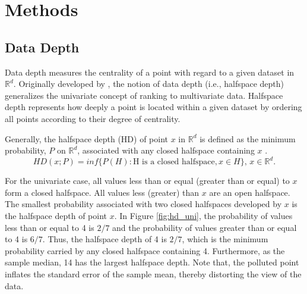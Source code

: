 \documentclass[a4paper,UKenglish]{lipics-v2018}
\begin{document}
%
%


\section{Methods}
\label{sec:methods}

\subsection{Data Depth}
Data depth measures the centrality of a point with regard to a given dataset in $\mathbb{R}^d$.
Originally developed by \cite{tukey75ICM}, the notion of data depth (i.e., halfspace depth) generalizes the univariate concept of ranking to multivariate data.
Halfspace depth represents how deeply a point is located within a given dataset by ordering all points according to their degree of centrality. 

Generally, the halfspace depth (HD) of point $x$ in $\mathbb{R}^d$ is defined as the minimum probability, $P$ on $\mathbb{R}^d$, associated with any closed halfspace containing $x$ \cite{liu00AS}. 
\begin{equation*}\label{eq:hd}
HD(x;P) = inf\{P(H): \text{H is a closed halfspace}, x \in H\}\text{, } x \in \mathbb{R}^d.
\end{equation*}

For the univariate case, all values less than or equal (greater than or equal) to $x$ form a closed halfspace.
All values less (greater) than $x$ are an open halfspace.
The smallest probability associated with two closed halfspaces developed by $x$ is the halfspace depth of point $x$.
In Figure \ref{fig:hd_uni}, the probability of values less than or equal to 4 is $2/7$ and the probability of values greater than or equal to 4 is $6/7$.
Thus, the halfspace depth of 4 is $2/7$, which is the minimum probability carried by any closed halfspace containing 4.
Furthermore, as the sample median, 14 has the largest halfspace depth.
Note that, the polluted point inflates the standard error of the sample mean, thereby distorting the view of the data. 
\end{document}
